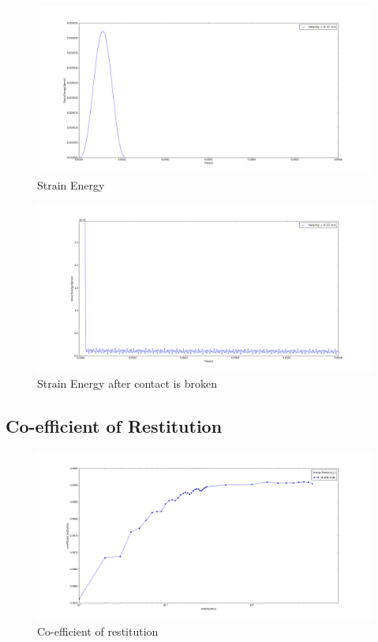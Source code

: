 \begin{figure}[H]
\includegraphics[width=1.0\textwidth]{../images/StrainEnergy/strainenergy.png}
\caption{Strain Energy}
\label{fig:SE}
\end{figure}
\begin{figure}[H]
\includegraphics[width=1.0\textwidth]{../images/StrainEnergy/strainenergy-zoomed.png}
\caption{Strain Energy after contact is broken}
\label{fig:SEzoomed}
\end{figure}


\subsection{Co-efficient of Restitution}

\begin{figure}[H]
\includegraphics[width=1.0\textwidth]{../images/COR/COR.png}
\caption{Co-efficient of restitution}
\label{fig:COR}
\end{figure}

